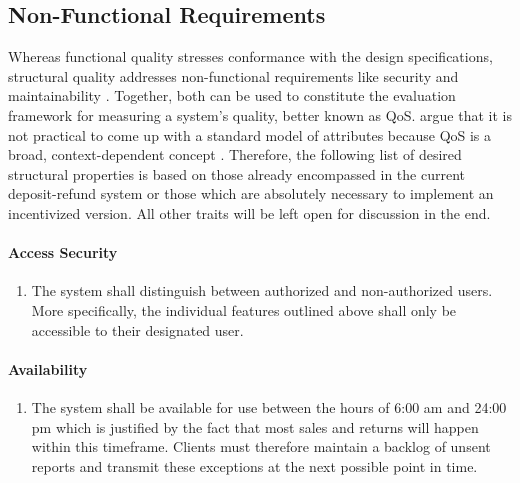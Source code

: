 \subsection{Non-Functional Requirements}
\label{sec:NFRs}
Whereas functional quality stresses conformance with the design specifications, structural quality addresses non-functional requirements like security and maintainability \cite[p.~2]{Martinez-Ortiz:2016:QMW:3011141.3011203}. Together, both can be used to constitute the evaluation framework for measuring a system's quality, better known as \ac{QoS}. \citeauthor{Liu:2004:QCP:1013367.1013379} argue that it is not practical to come up with a standard model of attributes because \ac{QoS} is a broad, context-dependent concept \cite[p.~67]{Liu:2004:QCP:1013367.1013379}. Therefore, the following list of desired structural properties is based on those already encompassed in the current deposit-refund system or those which are absolutely necessary to implement an incentivized version. All other traits will be left open for discussion in the end.

\paragraph{Access Security}
\begin{enumerate}[font=\sffamily, label={\textbf{NFR-\protect\twodigits{\theenumi}}},leftmargin=1.7cm, ref=NFR-\protect\twodigits{\theenumi}]  
	\item The system shall distinguish between authorized and non-authorized users. More specifically, the individual features outlined above shall only be accessible to their designated user.\label{itm:accessSecurity}
\end{enumerate}

\paragraph{Availability}
\begin{enumerate}[resume, font=\sffamily, label={\textbf{NFR-\protect\twodigits{\theenumi}}},leftmargin=1.7cm, ref=NFR-\protect\twodigits{\theenumi}]  
	\item The system shall be available for use between the hours of 6:00 am and 24:00 pm which is justified by the fact that most sales and returns will happen within this timeframe. Clients must therefore maintain a backlog of unsent reports and transmit these exceptions at the next possible point in time.\label{itm:operatingTimes}
\end{enumerate}

